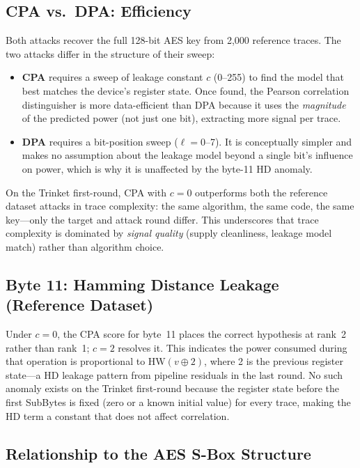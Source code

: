 \subsection{CPA vs.\ DPA: Efficiency}

Both attacks recover the full 128-bit AES key from 2{,}000 reference traces.
The two attacks differ in the structure of their sweep:

\begin{itemize}
  \item \textbf{CPA} requires a sweep of leakage constant $c$ (0--255)
        to find the model that best matches the device's register state.
        Once found, the Pearson correlation distinguisher is more
        data-efficient than DPA because it uses the \emph{magnitude} of
        the predicted power (not just one bit), extracting more signal
        per trace.

  \item \textbf{DPA} requires a bit-position sweep ($\ell = 0$--7).
        It is conceptually simpler and makes no assumption about the
        leakage model beyond a single bit's influence on power, which is
        why it is unaffected by the byte-11 HD anomaly.
\end{itemize}

On the Trinket first-round, CPA with $c=0$ outperforms both the reference
dataset attacks in trace complexity: the same algorithm, the same code,
the same key---only the target and attack round differ.
This underscores that trace complexity is dominated by \emph{signal quality}
(supply cleanliness, leakage model match) rather than algorithm choice.

\subsection{Byte 11: Hamming Distance Leakage (Reference Dataset)}

Under $c=0$, the CPA score for byte~11 places the correct hypothesis at
rank~2 rather than rank~1; $c=2$ resolves it.
This indicates the power consumed during that operation is proportional
to $\mathrm{HW}(v \oplus 2)$, where 2 is the previous register state---a
HD leakage pattern from pipeline residuals in the last round.
No such anomaly exists on the Trinket first-round because the register
state before the first SubBytes is fixed (zero or a known initial value)
for every trace, making the HD term a constant that does not affect
correlation.

\subsection{Relationship to the AES S-Box Structure}


